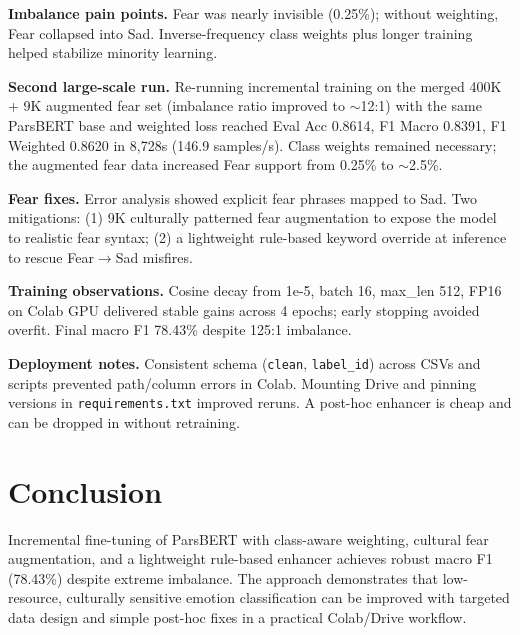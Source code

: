 \documentclass[11pt]{article}
\begin{document}
\textbf{Imbalance pain points.} Fear was nearly invisible (0.25\%); without weighting, Fear collapsed into Sad. Inverse-frequency class weights plus longer training helped stabilize minority learning.

\textbf{Second large-scale run.} Re-running incremental training on the merged 400K + 9K augmented fear set (imbalance ratio improved to \(\sim\)12:1) with the same ParsBERT base and weighted loss reached Eval Acc 0.8614, F1 Macro 0.8391, F1 Weighted 0.8620 in 8{,}728s (146.9 samples/s). Class weights remained necessary; the augmented fear data increased Fear support from 0.25\% to \(\sim\)2.5\%.

\textbf{Fear fixes.} Error analysis showed explicit fear phrases mapped to Sad. Two mitigations: (1) 9K culturally patterned fear augmentation to expose the model to realistic fear syntax; (2) a lightweight rule-based keyword override at inference to rescue Fear\(\rightarrow\)Sad misfires.

\textbf{Training observations.} Cosine decay from 1e-5, batch 16, max\_len 512, FP16 on Colab GPU delivered stable gains across 4 epochs; early stopping avoided overfit. Final macro F1 78.43\% despite 125:1 imbalance.

\textbf{Deployment notes.} Consistent schema (\texttt{clean}, \texttt{label\_id}) across CSVs and scripts prevented path/column errors in Colab. Mounting Drive and pinning versions in \texttt{requirements.txt} improved reruns. A post-hoc enhancer is cheap and can be dropped in without retraining.

\section{Conclusion}
Incremental fine-tuning of ParsBERT with class-aware weighting, cultural fear augmentation, and a lightweight rule-based enhancer achieves robust macro F1 (78.43\%) despite extreme imbalance. The approach demonstrates that low-resource, culturally sensitive emotion classification can be improved with targeted data design and simple post-hoc fixes in a practical Colab/Drive workflow.



\end{document}
